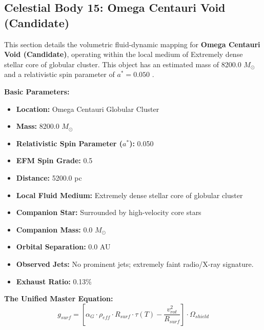 \documentclass[11pt, a4paper]{article}
\begin{document}
\clearpage
\subsection{Celestial Body 15: Omega Centauri Void (Candidate)}
This section details the volumetric fluid-dynamic mapping for \textbf{Omega Centauri Void (Candidate)}, operating within the local medium of Extremely dense stellar core of globular cluster. This object has an estimated mass of 8200.0 $M_{\odot}$ and a relativistic spin parameter of $a^* = 0.050$ \cite{gebhardt2024, simbad}.

\vspace{0.5em}
\noindent \textbf{Basic Parameters:}
\begin{itemize}
  \item \textbf{Location:} Omega Centauri Globular Cluster
  \item \textbf{Mass:} 8200.0 $M_{\odot}$
  \item \textbf{Relativistic Spin Parameter ($a^*$):} 0.050
  \item \textbf{EFM Spin Grade:} 0.5
  \item \textbf{Distance:} 5200.0 pc
  \item \textbf{Local Fluid Medium:} Extremely dense stellar core of globular cluster
  \item \textbf{Companion Star:} Surrounded by high-velocity core stars
  \item \textbf{Companion Mass:} 0.0 $M_{\odot}$
  \item \textbf{Orbital Separation:} 0.0 AU
  \item \textbf{Observed Jets:} No prominent jets; extremely faint radio/X-ray signature.
  \item \textbf{Exhaust Ratio:} 0.13\%
\end{itemize}

\vspace{0.5em}
\noindent \textbf{The Unified Master Equation:}
$$ g_{surf} = \left[ \alpha_G \cdot \rho_{eff} \cdot R_{surf} \cdot \tau(T) - \frac{v_{rot}^2}{R_{surf}} \right] \cdot \Omega_{shield} $$
\end{document}
